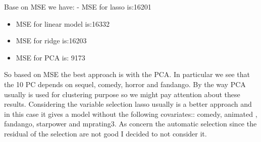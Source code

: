 \documentclass[11pt]{article}
\makeatletter
\newcommand{\boxspacing}{\kern\kvtcb@left@rule\kern\kvtcb@boxsep}
\newcommand{\prompt}[4]{
        {\ttfamily\llap{{\color{#2}[#3]:\hspace{3pt}#4}}\vspace{-\baselineskip}}
    }
\makeatother
\begin{document}
Base on MSE we have: - MSE for lasso is:16201

\begin{itemize}
\item
  MSE for linear model is:16332
\item
  MSE for ridge is:16203
\item
  MSE for PCA is: 9173
\end{itemize}

So based on MSE the best approach is with the PCA. In particular we see
that the 10 PC depends on sequel, comedy, horror and fandango. By the
way PCA usually is used for clustering purpose so we might pay attention
about these results. Considering the variable selection lasso usually is
a better approach and in this case it gives a model without the
following covariates:: comedy, animated , fandango, starpower and
mprating3. As concern the automatic selection since the residual of the
selection are not good I decided to not consider it.

    \begin{tcolorbox}[breakable, size=fbox, boxrule=1pt, pad at break*=1mm,colback=cellbackground, colframe=cellborder]
\prompt{In}{incolor}{ }{\boxspacing}
\begin{Verbatim}[commandchars=\\\{\}]

\end{Verbatim}
\end{tcolorbox}


    
    
    
\end{document}
